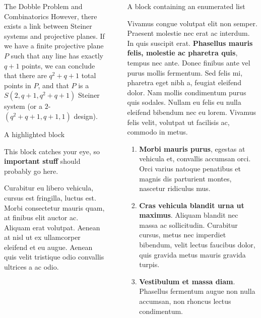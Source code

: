 \documentclass[final]{beamer}
\newlength{\sepwidth}
\newlength{\colwidth}
\newcommand{\separatorcolumn}{\begin{column}{\sepwidth}\end{column}}
\begin{document}
\begin{frame}[t]
\begin{columns}[t]
\begin{column}{\colwidth}
\begin{block}{The Dobble Problem and Combinatorics}
However, there exists a link between Steiner systems and projective planes. If we have a finite projective plane $P$ such that any line has exactly $q+1$ points, we can conclude that there are $q^2+q+1$ total points in $P$, and that $P$ is a $S(2, q+ 1, q^2 +q+ 1)$
Steiner system (or a $2$-$(q^2 +q+ 1, q + 1, 1)$ design)\cite{storme2006}.
  \end{block}

  \begin{alertblock}{A highlighted block}

    This block catches your eye, so \textbf{important stuff} should probably go
    here.

    Curabitur eu libero vehicula, cursus est fringilla, luctus est. Morbi
    consectetur mauris quam, at finibus elit auctor ac. Aliquam erat volutpat.
    Aenean at nisl ut ex ullamcorper eleifend et eu augue. Aenean quis velit
    tristique odio convallis ultrices a ac odio.

  \end{alertblock}

\end{column}

\separatorcolumn

\begin{column}{\colwidth}

  \begin{block}{A block containing an enumerated list}

    Vivamus congue volutpat elit non semper. Praesent molestie nec erat ac
    interdum. In quis suscipit erat. \textbf{Phasellus mauris felis, molestie
    ac pharetra quis}, tempus nec ante. Donec finibus ante vel purus mollis
    fermentum. Sed felis mi, pharetra eget nibh a, feugiat eleifend dolor. Nam
    mollis condimentum purus quis sodales. Nullam eu felis eu nulla eleifend
    bibendum nec eu lorem. Vivamus felis velit, volutpat ut facilisis ac,
    commodo in metus.

    \begin{enumerate}
      \item \textbf{Morbi mauris purus}, egestas at vehicula et, convallis
        accumsan orci. Orci varius natoque penatibus et magnis dis parturient
        montes, nascetur ridiculus mus.
      \item \textbf{Cras vehicula blandit urna ut maximus}. Aliquam blandit nec
        massa ac sollicitudin. Curabitur cursus, metus nec imperdiet bibendum,
        velit lectus faucibus dolor, quis gravida metus mauris gravida turpis.
      \item \textbf{Vestibulum et massa diam}. Phasellus fermentum augue non
        nulla accumsan, non rhoncus lectus condimentum.
    \end{enumerate}


\end{block}
\end{column}
\end{columns}
\end{frame}
\end{document}

